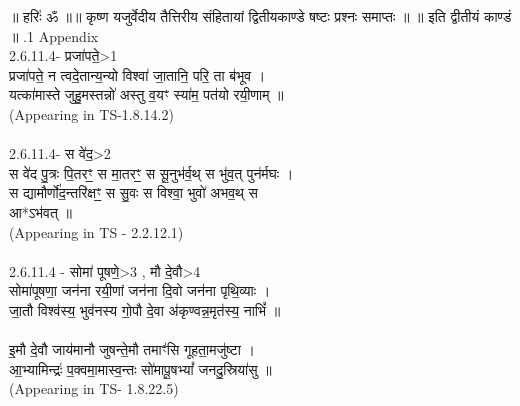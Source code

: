 \documentclass[17pt]{extarticle}
\begin{document}
॥ हरिः॑ ॐ ॥॥ कृष्ण यजुर्वेदीय तैत्तिरीय संहितायां द्वितीयकाण्डे षष्टः प्रश्नः समाप्तः ॥
॥ इति द्वीतीयं काण्डं ॥ \newline
{}.1   Appendix\\2.6.11.4- प्रजा॑पते॒>1\\प्रजा॑पते॒ न त्वदे॒तान्य॒न्यो विश्वा॑ जा॒तानि॒ परि॒ ता ब॑भूव । \\यत्का॑मास्ते जुहु॒मस्तन्नो॑ अस्तु व॒यꣳ स्या॑म॒ पत॑यो रयी॒णाम् ॥\\(Appearing in TS-1.8.14.2)\\\\2.6.11.4- स वे॑द॒>2\\स वे॑द पु॒त्रः पि॒तरꣳ॒॒ स मा॒तरꣳ॒॒ स सू॒नुभ॑र्व॒थ् स भु॑व॒त् पुन॑र्मघः । \\स द्यामौर्णो॑द॒न्तरि॑क्षꣳ॒॒ स सु॒वः स विश्वा॒ भुवो॑ अभव॒थ् स \\आ*ऽभ॑वत् ॥\\(Appearing in TS - 2.2.12.1)\\\\2.6.11.4 - सोमा॑ पूषणे॒>3 , मौ दे॒वौ>4\\सोमा॑पूषणा॒ जन॑ना रयी॒णां जन॑ना दि॒वो जन॑ना पृथि॒व्याः ।\\जा॒तौ विश्व॑स्य॒ भुव॑नस्य गो॒पौ दे॒वा अ॑कृण्वन्न॒मृत॑स्य॒ नाभिं᳚ ॥\\\\इ॒मौ दे॒वौ जाय॑मानौ जुषन्ते॒मौ तमाꣳ॑सि गूहता॒मजु॑ष्टा । \\आ॒भ्यामिन्द्रः॑ प॒क्वमा॒मास्व॒न्तः सो॑मापू॒षभ्यां᳚ जनदु॒स्रिया॑सु ॥ \\(Appearing in TS- 1.8.22.5)\\\\\\\\
\pagebreak
        
\end{document}
